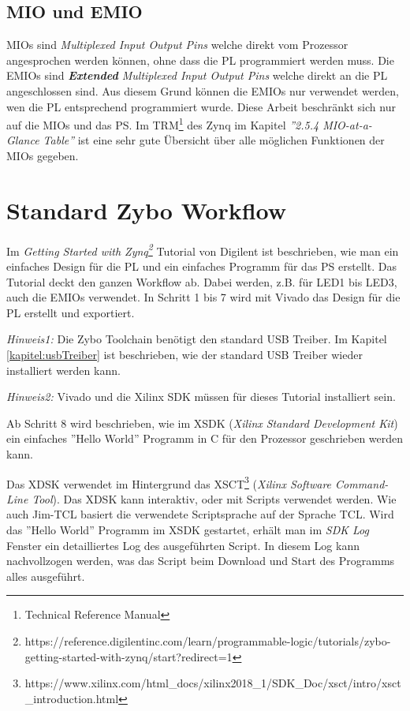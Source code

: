 \subsection{MIO und EMIO}
MIOs sind \textit{Multiplexed Input Output Pins} welche direkt vom Prozessor angesprochen werden können, ohne dass die PL programmiert werden muss.
Die EMIOs sind \textit{\textbf{Extended} Multiplexed Input Output Pins} welche direkt an die PL angeschlossen sind.
Aus diesem Grund können die EMIOs nur verwendet werden, wen die PL entsprechend programmiert wurde.
Diese Arbeit beschränkt sich nur auf die MIOs und das PS.
Im TRM\footnote{Technical Reference Manual} des Zynq\cite{bib:ZynqTechnicalReferenceManual} im Kapitel \textit{''2.5.4 MIO-at-a-Glance Table''} ist eine sehr gute Übersicht über alle möglichen Funktionen der MIOs gegeben.


\section{Standard Zybo Workflow}
Im \textit{Getting Started with Zynq\footnote{https://reference.digilentinc.com/learn/programmable-logic/tutorials/zybo-getting-started-with-zynq/start?redirect=1}} Tutorial von Digilent ist beschrieben, wie man ein einfaches Design für die PL und ein einfaches Programm für das PS erstellt.
Das Tutorial deckt den ganzen Workflow ab.
Dabei werden, z.B. für LED1 bis LED3, auch die EMIOs verwendet.
In Schritt 1 bis 7 wird mit Vivado das Design für die PL erstellt und exportiert.

\textit{Hinweis1:} Die Zybo Toolchain benötigt den standard USB Treiber. Im Kapitel \ref{kapitel:usbTreiber} ist beschrieben, wie der standard USB Treiber wieder installiert werden kann.

\textit{Hinweis2:} Vivado und die Xilinx SDK müssen für dieses Tutorial installiert sein.

Ab Schritt 8 wird beschrieben, wie im XSDK (\textit{Xilinx Standard Development Kit}) ein einfaches ''Hello World'' Programm in C für den Prozessor geschrieben werden kann.

Das XDSK verwendet im Hintergrund das XSCT\footnote{https://www.xilinx.com/html\_docs/xilinx2018\_1/SDK\_Doc/xsct/intro/xsct\_introduction.html} (\textit{Xilinx Software Command-Line Tool}).
Das XDSK kann interaktiv, oder mit Scripts verwendet werden.
Wie auch Jim-TCL basiert die verwendete Scriptsprache auf der Sprache TCL.
Wird das ''Hello World'' Programm im XSDK gestartet, erhält man im \textit{SDK Log} Fenster ein detailliertes Log des ausgeführten Script.
In diesem Log kann nachvollzogen werden, was das Script beim Download und Start des Programms alles ausgeführt.

